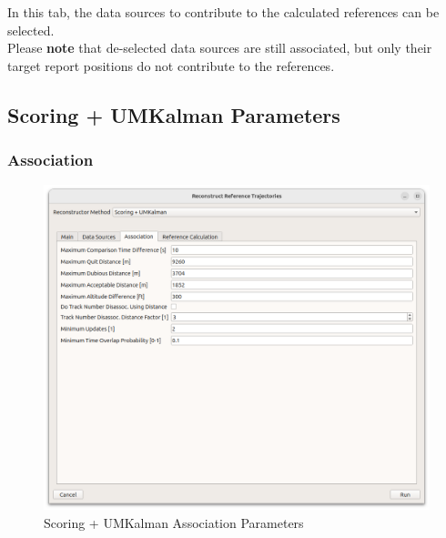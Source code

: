 In this tab, the data sources to contribute to the calculated references can be selected. \\

Please \textbf{note} that de-selected data sources are still associated, but only their target report positions do not contribute to the references.

\subsection{Scoring + UMKalman Parameters}

\subsubsection{Association}

\begin{figure}[H]
    \center
      \includegraphics[width=16cm]{figures/dialog_scorum_assoc.png}
    \caption{Scoring + UMKalman Association Parameters}
\end{figure}

